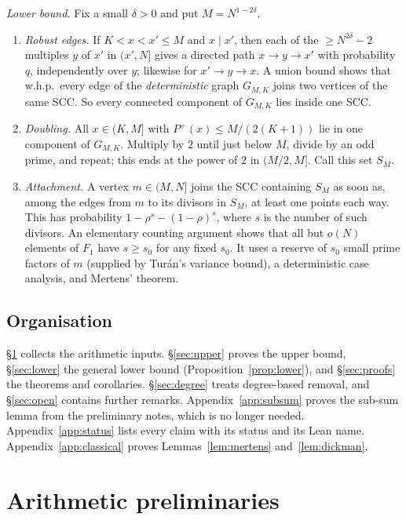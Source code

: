\documentclass[11pt]{amsart}
\theoremstyle{definition}
\newcommand{\Pp}{P^{+}}
\begin{document}
\emph{Lower bound.} Fix a small $\delta>0$ and put $M=N^{1-2\delta}$.
\begin{enumerate}[label=(\arabic*)]
\item \emph{Robust edges.} If $K<x<x'\le M$ and $x\mid x'$, then each of the $\ge N^{2\delta}-2$ multiples $y$ of $x'$ in $(x',N]$ gives a directed path $x\to y\to x'$ with probability $q$, independently over $y$; likewise for $x'\to y\to x$. A union bound shows that w.h.p.\ every edge of the \emph{deterministic} graph $G_{M,K}$ joins two vertices of the same SCC. So every connected component of $G_{M,K}$ lies inside one SCC.
\item \emph{Doubling.} All $x\in(K,M]$ with $\Pp(x)\le M/(2(K+1))$ lie in one component of $G_{M,K}$. Multiply by $2$ until just below $M$, divide by an odd prime, and repeat; this ends at the power of $2$ in $(M/2,M]$. Call this set $S_M$.
\item \emph{Attachment.} A vertex $m\in(M,N]$ joins the SCC containing $S_M$ as soon as, among the edges from $m$ to its divisors in $S_M$, at least one points each way. This has probability $1-\rho^{s}-(1-\rho)^s$, where $s$ is the number of such divisors. An elementary counting argument shows that all but $o(N)$ elements of $F_1$ have $s\ge s_0$ for any fixed $s_0$. It uses a reserve of $s_0$ small prime factors of $m$ (supplied by Tur\'an's variance bound), a deterministic case analysis, and Mertens' theorem.
\end{enumerate}

\subsection*{Organisation}
\S\ref{sec:prelim} collects the arithmetic inputs. \S\ref{sec:upper} proves the upper bound, \S\ref{sec:lower} the general lower bound (Proposition~\ref{prop:lower}), and \S\ref{sec:proofs} the theorems and corollaries. \S\ref{sec:degree} treats degree-based removal, and \S\ref{sec:open} contains further remarks. Appendix~\ref{app:subsum} proves the sub-sum lemma from the preliminary notes, which is no longer needed. Appendix~\ref{app:status} lists every claim with its status and its Lean name. Appendix~\ref{app:classical} proves Lemmas~\ref{lem:mertens} and~\ref{lem:dickman}.

\section{Arithmetic preliminaries}\label{sec:prelim}
\end{document}
